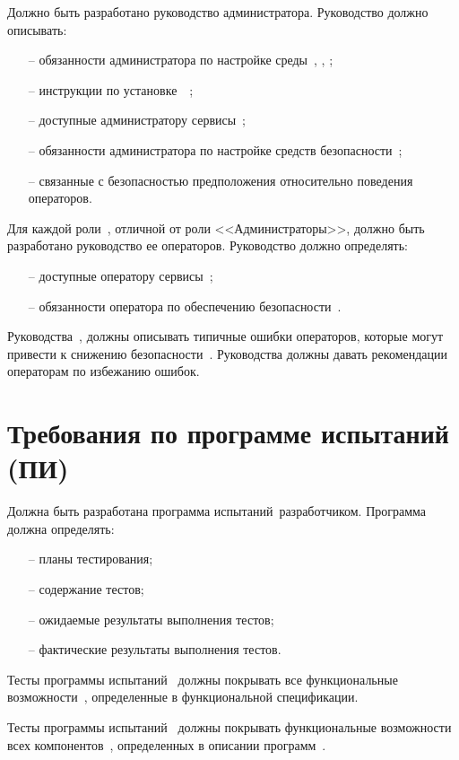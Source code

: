 \label{AdminGuide}
Должно быть разработано руководство администратора.
Руководство должно описывать:
\begin{itemize}
\item[--]
обязанности администратора по настройке среды~, 
, ;
\item[--]
инструкции по установке~\TOE~;
\item[--]
доступные администратору сервисы~;
\item[--]
обязанности администратора по настройке средств безопасности~\TOE;
\item[--]
связанные с безопасностью предположения 
относительно поведения операторов.
\end{itemize}

\label{UserGuide}
Для каждой роли~, отличной от роли <<Администраторы>>, 
должно быть разработано руководство ее операторов.
Руководство должно определять:
\begin{itemize}
\item[--]
доступные оператору сервисы~;
\item[--]
обязанности оператора по обеспечению безопасности~\TOE.
\end{itemize}

\label{Misuse}
Руководства~,  
должны описывать типичные ошибки операторов,
которые могут привести к снижению безопасности~\TOE.
Руководства должны давать рекомендации операторам по избежанию
ошибок.

\section{Требования по программе испытаний (ПИ)}

\label{TestProgram}
Должна быть разработана программа испытаний~\TOE разработчиком.
Программа должна определять:
\begin{itemize}
\item[--]
планы тестирования;
\item[--]
содержание тестов;
\item[--]
ожидаемые результаты выполнения тестов;
\item[--]
фактические результаты выполнения тестов.
\end{itemize}

\label{TestCoverage}
Тесты программы испытаний~ должны 
покрывать все функциональные возможности~\TOE, 
определенные в функциональной спецификации.

\label{TestDeep}
Тесты программы испытаний~ должны 
покрывать функциональные возможности всех компонентов~\TOE, 
определенных в описании программ~.


